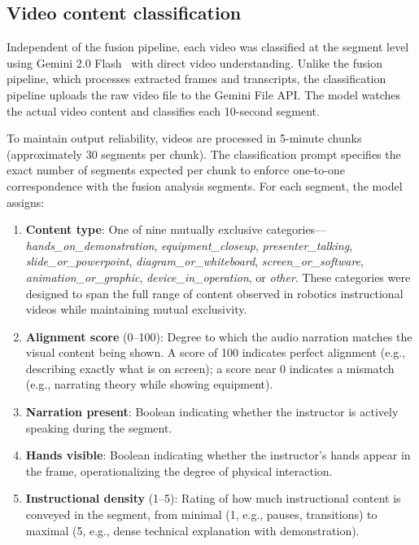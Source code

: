 \documentclass[fleqn,10pt]{wlscirep}
\begin{document}
\subsection*{Video content classification}

Independent of the fusion pipeline, each video was classified at the segment level using Gemini 2.0 Flash~\cite{geminiteam2024gemini2} with direct video understanding. Unlike the fusion pipeline, which processes extracted frames and transcripts, the classification pipeline uploads the raw video file to the Gemini File API. The model watches the actual video content and classifies each 10-second segment.

To maintain output reliability, videos are processed in 5-minute chunks (approximately 30 segments per chunk). The classification prompt specifies the exact number of segments expected per chunk to enforce one-to-one correspondence with the fusion analysis segments. For each segment, the model assigns:

\begin{enumerate}
    \item \textbf{Content type}: One of nine mutually exclusive categories---\emph{hands\_on\_demonstration}, \emph{equipment\_closeup}, \emph{presenter\_talking}, \emph{slide\_or\_powerpoint}, \emph{diagram\_or\_whiteboard}, \emph{screen\_or\_software}, \emph{animation\_or\_graphic}, \emph{device\_in\_operation}, or \emph{other}. These categories were designed to span the full range of content observed in robotics instructional videos while maintaining mutual exclusivity.
    \item \textbf{Alignment score} (0--100): Degree to which the audio narration matches the visual content being shown. A score of 100 indicates perfect alignment (e.g., describing exactly what is on screen); a score near 0 indicates a mismatch (e.g., narrating theory while showing equipment).
    \item \textbf{Narration present}: Boolean indicating whether the instructor is actively speaking during the segment.
    \item \textbf{Hands visible}: Boolean indicating whether the instructor's hands appear in the frame, operationalizing the degree of physical interaction.
    \item \textbf{Instructional density} (1--5): Rating of how much instructional content is conveyed in the segment, from minimal (1, e.g., pauses, transitions) to maximal (5, e.g., dense technical explanation with demonstration).
\end{enumerate}
\end{document}
